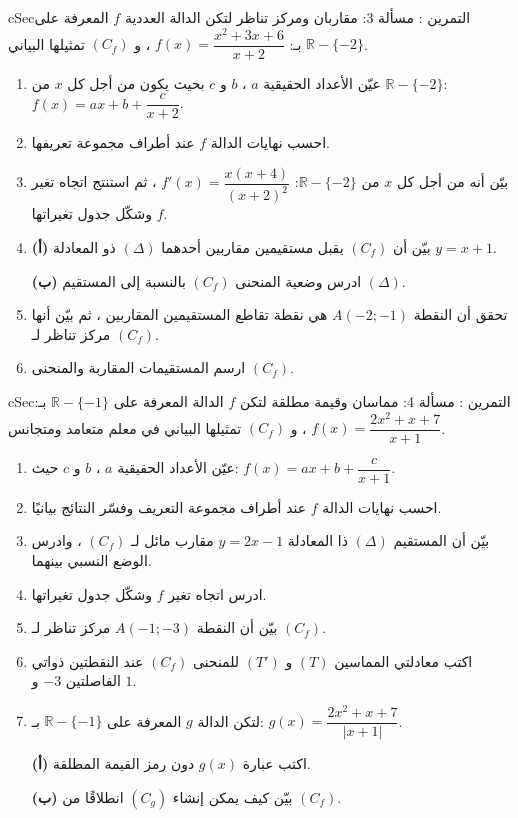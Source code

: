 \documentclass[12pt,a4paper]{article}
\newenvironment{BOX}[2]{\begin{otherlanguage}{english}\begin{arbox}{#1}{#2}}{\end{arbox}\end{otherlanguage}}
\newcounter{exo}
\newenvironment{tamrin}[1]{\stepcounter{exo}\begin{BOX}{cSec}{التمرين \theexo: #1}}{\end{BOX}}
\newcommand{\R}{\mathbb{R}}
\newcommand{\pa}{\par\smallskip\textbf{(أ)} }\newcommand{\pb}{\par\smallskip\textbf{(ب)} }\newcommand{\pc}{\par\smallskip\textbf{(جـ)} }\newcommand{\pd}{\par\smallskip\textbf{(د)} }\newcommand{\pe}{\par\smallskip\textbf{(هـ)} }
\begin{document}
\begin{tamrin}{مسألة 3: مقاربان ومركز تناظر}
لتكن الدالة العددية $f$ المعرفة على $\R-\{-2\}$ بـ: $f(x)=\dfrac{x^2+3x+6}{x+2}$ ، و $(C_f)$ تمثيلها البياني.
\begin{enumerate}
\item عيّن الأعداد الحقيقية $a$ ، $b$ و $c$ بحيث يكون من أجل كل $x$ من $\R-\{-2\}$: $f(x)=ax+b+\dfrac{c}{x+2}$.
\item احسب نهايات الدالة $f$ عند أطراف مجموعة تعريفها.
\item بيّن أنه من أجل كل $x$ من $\R-\{-2\}$: $f'(x)=\dfrac{x(x+4)}{(x+2)^2}$ ، ثم استنتج اتجاه تغير $f$ وشكّل جدول تغيراتها.
\item \pa بيّن أن $(C_f)$ يقبل مستقيمين مقاربين أحدهما $(\Delta)$ ذو المعادلة $y=x+1$.
\pb ادرس وضعية المنحنى $(C_f)$ بالنسبة إلى المستقيم $(\Delta)$.
\item تحقق أن النقطة $A(-2;-1)$ هي نقطة تقاطع المستقيمين المقاربين ، ثم بيّن أنها مركز تناظر لـ $(C_f)$.
\item ارسم المستقيمات المقاربة والمنحنى $(C_f)$.
\end{enumerate}
\end{tamrin}

\begin{tamrin}{مسألة 4: مماسان وقيمة مطلقة}
لتكن $f$ الدالة المعرفة على $\R-\{-1\}$ بـ: $f(x)=\dfrac{2x^2+x+7}{x+1}$ ، و $(C_f)$ تمثيلها البياني في معلم متعامد ومتجانس.
\begin{enumerate}
\item عيّن الأعداد الحقيقية $a$ ، $b$ و $c$ حيث: $f(x)=ax+b+\dfrac{c}{x+1}$.
\item احسب نهايات الدالة $f$ عند أطراف مجموعة التعريف وفسّر النتائج بيانيًا.
\item بيّن أن المستقيم $(\Delta)$ ذا المعادلة $y=2x-1$ مقارب مائل لـ $(C_f)$ ، وادرس الوضع النسبي بينهما.
\item ادرس اتجاه تغير $f$ وشكّل جدول تغيراتها.
\item بيّن أن النقطة $A(-1;-3)$ مركز تناظر لـ $(C_f)$.
\item اكتب معادلتي المماسين $(T)$ و $(T')$ للمنحنى $(C_f)$ عند النقطتين ذواتي الفاصلتين $-3$ و $1$.
\item لتكن الدالة $g$ المعرفة على $\R-\{-1\}$ بـ: $g(x)=\dfrac{2x^2+x+7}{|x+1|}$.
\pa اكتب عبارة $g(x)$ دون رمز القيمة المطلقة.
\pb بيّن كيف يمكن إنشاء $(C_g)$ انطلاقًا من $(C_f)$.
\end{enumerate}
\end{tamrin}
\end{document}
